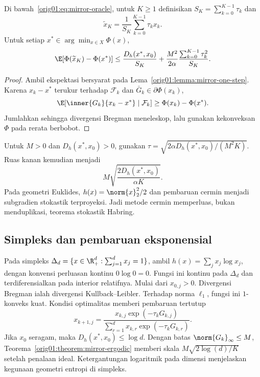 \begin{theorem}
  \label{orig01:theorem:mirror-ergodic}
  Di bawah~\eqref{orig01:eq:mirror-oracle}, untuk $K\geq1$ definisikan
  $S_K=\sum_{k=0}^{K-1}\tau_k$ dan
  \begin{equation}
    \widetilde x_K=\frac1{S_K}\sum_{k=0}^{K-1}\tau_kx_k.
  \end{equation}
  Untuk setiap $x^*\in\arg\min_{x\in X}\Phi(x)$,
  \begin{equation}
    \label{orig01:eq:mirror-rate}
    \E[\Phi(\widetilde x_K)-\Phi(x^*)]
    \leq
    \frac{D_h(x^*,x_0)}{S_K}
    +\frac{M^2}{2\alpha}
      \frac{\sum_{k=0}^{K-1}\tau_k^2}{S_K}.
  \end{equation}
\end{theorem}

\begin{proof}
  Ambil ekspektasi bersyarat pada
  Lema~\ref{orig01:lemma:mirror-one-step}. Karena $x_k-x^*$ terukur terhadap
  $\mathcal F_k$ dan $\bar G_k\in\partial\Phi(x_k)$,
  \begin{equation}
    \E[\inner{G_k}{x_k-x^*}\mid\mathcal F_k]
    \geq\Phi(x_k)-\Phi(x^*).
  \end{equation}
  Jumlahkan sehingga divergensi Bregman meneleskop, lalu gunakan kekonveksan
  $\Phi$ pada rerata berbobot.
\end{proof}

Untuk $M>0$ dan $D_h(x^*,x_0)>0$, gunakan
$\tau=\sqrt{2\alpha D_h(x^*,x_0)/(M^2K)}$. Ruas kanan kemudian menjadi
\begin{equation}
  M\sqrt{\frac{2D_h(x^*,x_0)}{\alpha K}}.
\end{equation}
Pada geometri Euklides, $h(x)=\norm{x}_2^2/2$ dan pembaruan cermin menjadi
subgradien stokastik terproyeksi. Jadi metode cermin memperluas, bukan
menduplikasi, teorema stokastik Habring.

\subsection{Simpleks dan pembaruan eksponensial}
\label{orig01:subsection:entropy}

Pada simpleks
$\Delta_d=\{x\in\R_+^d:\sum_{j=1}^{d}x_j=1\}$, ambil
$h(x)=\sum_jx_j\log x_j$, dengan konvensi perluasan kontinu
$0\log0=0$. Fungsi ini kontinu pada $\Delta_d$ dan terdiferensialkan pada
interior relatifnya. Mulai dari $x_{0,j}>0$. Divergensi Bregman ialah
divergensi Kullback--Leibler. Terhadap norma $\ell_1$, fungsi ini
$1$-konveks kuat. Kondisi optimalitas memberi pembaruan tertutup
\begin{equation}
  \label{orig01:eq:exponentiated-update}
  x_{k+1,j}
  =\frac{x_{k,j}\exp(-\tau_kG_{k,j})}
         {\sum_{r=1}^{d}x_{k,r}\exp(-\tau_kG_{k,r})}.
\end{equation}
Jika $x_0$ seragam, maka $D_h(x^*,x_0)\leq\log d$. Dengan batas
$\norm{G_k}_\infty\leq M$, Teorema~\ref{orig01:theorem:mirror-ergodic}
memberi skala $M\sqrt{2\log(d)/K}$ setelah penalaan ideal. Ketergantungan
logaritmik pada dimensi menjelaskan kegunaan geometri entropi di simpleks.

